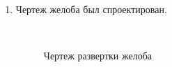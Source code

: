 \begin{enumerate}
\begin{enumerate}
		\item Чертеж желоба был спроектирован.
		\begin{figure}[H]
			\begin{minipage}[h]{0.2\linewidth}
				\center  
			\end{minipage}
			\begin{minipage}[h]{0.6\linewidth}
				\caption{Чертеж развертки желоба}
			\end{minipage}
		\end{figure}
		

\end{enumerate}
\end{enumerate}
